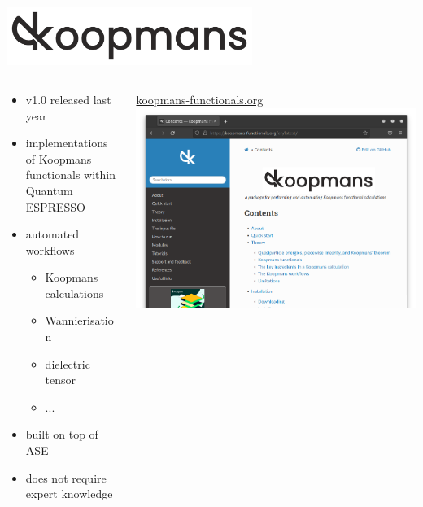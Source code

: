\documentclass[xcolor=table,aspectratio=169]{beamer}
\numberwithin{equation}{section}
\begin{document}
\begin{frame}{}
   \begin{center}
      \includegraphics[width=0.6\textwidth]{figures/koopmans_grey_on_transparent.png}
   \end{center}

   \vspace{-2ex}

   \begin{columns}
      \begin{column}{0.55\textwidth}
         \begin{itemize}
            \item v1.0 released last year\footnotemark[1]
            \item implementations of Koopmans functionals within Quantum ESPRESSO
            \item automated workflows
                  \begin{itemize}
                     \item Koopmans calculations
                     \item Wannierisation
                     \item dielectric tensor
                     \item ...
                  \end{itemize}
            \item built on top of ASE\footnotemark[2]
            \item does not require expert knowledge
         \end{itemize}
      \end{column}

      \begin{column}{0.4\textwidth}
         \centering
         \url{koopmans-functionals.org}
         \includegraphics[width=\columnwidth]{figures/website_cropped.png}
      \end{column}
   \end{columns}
\end{frame}
\end{document}

